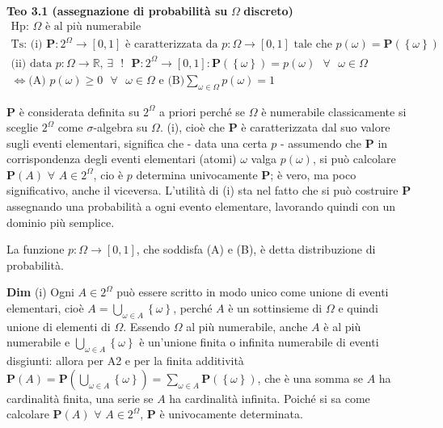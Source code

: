 \documentclass{article}
\begin{document}
\textbf{Teo 3.1 (assegnazione di probabilit\`{a} su }$\Omega $ \textbf{%
discreto)}%
\begin{gather*}
\text{Hp: }\Omega \text{ \`{e} al pi\`{u} numerabile} \\
\text{Ts: (i) }\mathbf{P}:2^{\Omega }\rightarrow \left[ 0,1\right] \text{ 
\`{e} caratterizzata da }p:\Omega \rightarrow \left[ 0,1\right] \text{ tale
che }p\left( \omega \right) =\mathbf{P}\left( \left\{ \omega \right\} \right)
\\
\text{(ii) data }p:\Omega \rightarrow 
\mathbb{R}
\text{, }\exists \text{ }!\text{ }\mathbf{P}:2^{\Omega }\rightarrow \left[
0,1\right] :\mathbf{P}\left( \left\{ \omega \right\} \right) =p\left( \omega
\right) \text{ }\forall \text{ }\omega \in \Omega \text{ } \\
\Longleftrightarrow \text{(A) }p\left( \omega \right) \geq 0\text{ }\forall 
\text{ }\omega \in \Omega \text{ e (B)}\sum_{\omega \in \Omega }p\left(
\omega \right) =1
\end{gather*}

$\mathbf{P}$ \`{e} considerata definita su $2^{\Omega }$ a priori perch\'{e}
se $\Omega $ \`{e} numerabile classicamente si sceglie $2^{\Omega }$ come $%
\sigma $-algebra su $\Omega $. (i), cio\`{e} che $\mathbf{P}$ \`{e}
caratterizzata dal suo valore sugli eventi elementari, significa che - data
una certa $p$ - assumendo che $\mathbf{P}$ in corrispondenza degli eventi
elementari (atomi) $\omega $ valga $p\left( \omega \right) $, si pu\`{o}
calcolare $\mathbf{P}\left( A\right) $ $\forall $ $A\in 2^{\Omega }$, cio%
\`{e} $p$ determina univocamente $\mathbf{P}$; \`{e} vero, ma poco
significativo, anche il viceversa. L'utilit\`{a} di (i) sta nel fatto che si
pu\`{o} costruire $\mathbf{P}$ assegnando una probabilit\`{a} a ogni evento
elementare, lavorando quindi con un dominio pi\`{u} semplice.

La funzione $p:\Omega \rightarrow \left[ 0,1\right] $, che soddisfa (A) e
(B), \`{e} detta distribuzione di probabilit\`{a}.

\textbf{Dim} (i) Ogni $A\in 2^{\Omega }$ pu\`{o} essere scritto in modo
unico come unione di eventi elementari, cio\`{e} $A=\bigcup_{\omega \in
A}\left\{ \omega \right\} $, perch\'{e} $A$ \`{e} un sottinsieme di $\Omega $
e quindi unione di elementi di $\Omega $. Essendo $\Omega $ al pi\`{u}
numerabile, anche $A$ \`{e} al pi\`{u} numerabile e $\bigcup_{\omega \in
A}\left\{ \omega \right\} $ \`{e} un'unione finita o infinita numerabile di
eventi disgiunti: allora per A2 e per la finita additivit\`{a} $\mathbf{P}%
\left( A\right) =\mathbf{P}\left( \bigcup_{\omega \in A}\left\{ \omega
\right\} \right) =\sum_{\omega \in A}\mathbf{P}\left( \left\{ \omega
\right\} \right) $, che \`{e} una somma se $A$ ha cardinalit\`{a} finita,
una serie se $A$ ha cardinalit\`{a} infinita. Poich\'{e} si sa come
calcolare $\mathbf{P}\left( A\right) $ $\forall $ $A\in 2^{\Omega }$, $%
\mathbf{P}$ \`{e} univocamente determinata.
\end{document}
